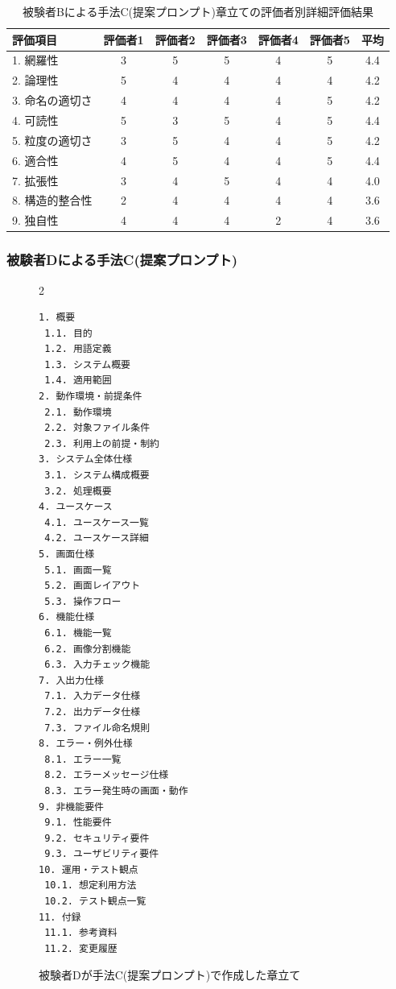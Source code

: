 \begin{table}[tp]
  \caption{被験者Bによる手法C(提案プロンプト)章立ての評価者別詳細評価結果}
  \label{tb:detailed_evaluation_results_C}
  \centering
  \begin{tabular}{|l|c|c|c|c|c|c|}
    \hline
    \textbf{評価項目} & \textbf{評価者1} & \textbf{評価者2} & \textbf{評価者3} & \textbf{評価者4} & \textbf{評価者5} & \textbf{平均} \\
    \hline\hline
    1. 網羅性 & 3 & 5 & 5 & 4 & 5 & 4.4 \\
    \hline
    2. 論理性 & 5 & 4 & 4 & 4 & 4 & 4.2 \\
    \hline
    3. 命名の適切さ & 4 & 4 & 4 & 4 & 5 & 4.2 \\
    \hline
    4. 可読性 & 5 & 3 & 5 & 4 & 5 & 4.4 \\
    \hline
    5. 粒度の適切さ & 3 & 5 & 4 & 4 & 5 & 4.2 \\
    \hline
    6. 適合性 & 4 & 5 & 4 & 4 & 5 & 4.4 \\
    \hline
    7. 拡張性 & 3 & 4 & 5 & 4 & 4 & 4.0 \\
    \hline
    8. 構造的整合性 & 2 & 4 & 4 & 4 & 4 & 3.6 \\
    \hline
    9. 独自性 & 4 & 4 & 4 & 2 & 4 & 3.6 \\
    \hline
  \end{tabular}
\end{table}




\subsubsection{被験者Dによる手法C(提案プロンプト)}

\begin{figure}[tp]
\begin{tcolorbox}[
  colback=white,
  colframe=orange,
  fonttitle=\bfseries
]
\begin{multicols}{2}
\footnotesize
\ttfamily
\fontsize{8}{9}\selectfont
\begin{verbatim}
1. 概要
 1.1. 目的
 1.2. 用語定義
 1.3. システム概要
 1.4. 適用範囲
2. 動作環境・前提条件
 2.1. 動作環境
 2.2. 対象ファイル条件
 2.3. 利用上の前提・制約
3. システム全体仕様
 3.1. システム構成概要
 3.2. 処理概要
4. ユースケース
 4.1. ユースケース一覧
 4.2. ユースケース詳細
5. 画面仕様
 5.1. 画面一覧
 5.2. 画面レイアウト
 5.3. 操作フロー
6. 機能仕様
 6.1. 機能一覧
 6.2. 画像分割機能
 6.3. 入力チェック機能
7. 入出力仕様
 7.1. 入力データ仕様
 7.2. 出力データ仕様
 7.3. ファイル命名規則
8. エラー・例外仕様
 8.1. エラー一覧
 8.2. エラーメッセージ仕様
 8.3. エラー発生時の画面・動作
9. 非機能要件
 9.1. 性能要件
 9.2. セキュリティ要件
 9.3. ユーザビリティ要件
10. 運用・テスト観点
 10.1. 想定利用方法
 10.2. テスト観点一覧
11. 付録
 11.1. 参考資料
 11.2. 変更履歴
\end{verbatim}
\end{multicols}
\end{tcolorbox}
\caption{被験者Dが手法C(提案プロンプト)で作成した章立て}
\label{fig:C_chapter_structure_of_bmp_app_2}
\end{figure}

